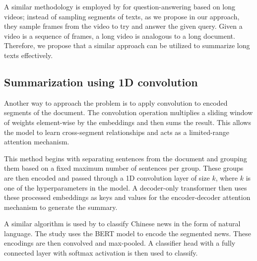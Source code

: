 A similar methodology is employed by \citet{wang2024videoagent} for
question-answering based on long videos;
instead of sampling segments of texts, as we propose in our approach, they sample
frames from the video to try and answer the given query.
Given a video is a sequence of frames, a long video is analogous to a long document.
Therefore, we propose that a similar approach can be utilized to summarize long texts
effectively.


\subsection{Summarization using 1D convolution}
\label{sub:serial}

Another way to approach the problem is to apply convolution to encoded segments of
the document.
The convolution operation multiplies a sliding window of weights element-wise by the
embeddings and then sums the result.
This allows the model to learn cross-segment relationships and acts as a
limited-range attention mechanism.

This method begins with separating sentences from the document and grouping them
based on a fixed maximum number of sentences per group.
These groups are then encoded and passed through a 1D convolution layer of size $k$,
where $k$ is one of the hyperparameters in the model.
A decoder-only transformer then uses these processed embeddings as keys and values
for the encoder-decoder attention mechanism to generate the summary.

A similar algorithm is used by \citet{chen2022long} to classify Chinese news in the
form of natural language.
The study uses the BERT model to encode the segmented news.
These encodings are then convolved and max-pooled.
A classifier head with a fully connected layer with softmax activation is then used
to classify.
